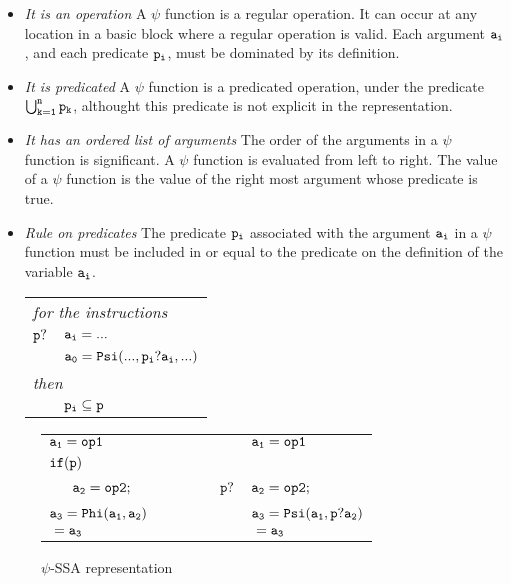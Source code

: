 \begin{itemize}

\item{\emph{It is an operation}} A $\psi$ function is a regular operation. It
  can occur at any location in a basic block where a regular operation
  is valid. Each argument ${\tt a_i}$, and each predicate ${\tt p_i}$,
  must be dominated by its definition.

\item{\emph{It is predicated}} A $\psi$ function is a predicated
  operation, under the predicate ${\tt \bigcup_{k=1}^n p_k}$,
  althought this predicate is not explicit in the representation.

\item{\emph{It has an ordered list of arguments}} The order of the
  arguments in a $\psi$ function is significant. A $\psi$ function is
  evaluated from left to right. The value of a $\psi$ function is the
  value of the right most argument whose predicate is true.

\item{\emph{Rule on predicates}} The predicate ${\tt p_i}$ associated
  with the argument ${\tt a_i}$ in a $\psi$ function must be included
  in or equal to the predicate on the definition of the variable ${\tt
    a_i}$.
\begin{tabular}{ll}
\multicolumn{2}{l}{\it for the instructions}\\
${\tt p?}$ & ${\tt a_i = ...}$\\
& ${\tt a_0 = Psi(..., p_i?a_i, ...)}$\\
\multicolumn{2}{l}{\it then}\\
& ${\tt p_i} \subseteq {\tt p}$\\
\end{tabular}

\end{itemize}

\begin{figure}
\begin{center}
\footnotesize
\begin{tabular}{llll}
${\tt a_1 = op1}$ & & & ${\tt a_1 = op1}$ \\
${\tt if (p)}$        & & & \\
${\tt\ \ \ \ \ a_2 = op2;}$ & \ \ \ \ \  & ${\tt p?}$ & ${\tt a_2 = op2;}$ \\
${\tt a_3 = Phi(a_1, a_2)}$ & & & ${\tt a_3 = Psi(a_1, p?a_2)}$ \\
${\tt \ = a_3}$ & & & ${\tt \ = a_3}$ \\
\end{tabular}
\caption{$\psi$-SSA representation}
\label{fig:op_pred}
\end{center}
\end{figure}

